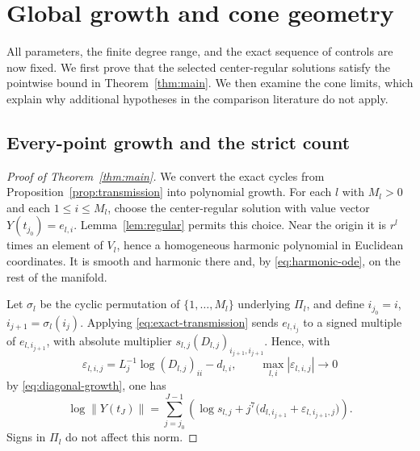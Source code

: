 \section{Global growth and cone geometry}
\label{sec:conclusion}

All parameters, the finite degree range, and the exact sequence of controls
are now fixed. We first prove that the selected center-regular solutions
satisfy the pointwise bound in Theorem~\ref{thm:main}. We then examine the
cone limits, which explain why additional hypotheses in the comparison
literature do not apply.

\subsection{Every-point growth and the strict count}
\begin{proof}[Proof of Theorem~\ref{thm:main}]
We convert the exact cycles from Proposition~\ref{prop:transmission} into polynomial growth.
For each \(l\) with \(M_l>0\) and each \(1\leq i\leq M_l\),
choose the center-regular solution with value vector
\(Y(t_{j_0})=e_{l,i}\).  Lemma~\ref{lem:regular} permits this
choice.  Near the origin it is \(r^l\) times an element of
\(V_l\), hence a homogeneous harmonic polynomial in Euclidean
coordinates.  It is smooth and harmonic there and, by
\eqref{eq:harmonic-ode}, on the rest of the manifold.

Let \(\sigma_l\) be the cyclic permutation of
\(\{1,\ldots,M_l\}\) underlying \(\Pi_l\), and define
\(i_{j_0}=i\), \(i_{j+1}=\sigma_l(i_j)\).  Applying
\eqref{eq:exact-transmission} sends \(e_{l,i_j}\) to a signed
multiple of \(e_{l,i_{j+1}}\), with absolute multiplier
\(s_{l,j}(D_{l,j})_{i_{j+1},i_{j+1}}\).  Hence, with
\[
 \varepsilon_{l,i,j}
   =L_j^{-1}\log(D_{l,j})_{ii}-d_{l,i},
 \qquad \max_{l,i}|\varepsilon_{l,i,j}|\longrightarrow0
\]
by \eqref{eq:diagonal-growth}, one has
\begin{equation}
 \log\|Y(t_J)\|=
 \sum_{j=j_0}^{J-1}
 \left(\log s_{l,j}
       +j^7\bigl(d_{l,i_{j+1}}+\varepsilon_{l,i_{j+1},j}\bigr)\right).
 \label{eq:cycle-sum}
\end{equation}
Signs in \(\Pi_l\) do not affect this norm.


\end{proof}
